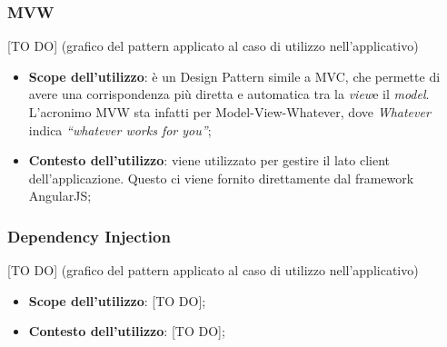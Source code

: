 	\subsubsection{MVW} %
	\label{ssub:mvw}
	[TO DO] (grafico del pattern applicato al caso di utilizzo nell'applicativo)
		\begin{itemize}
			\item \textbf{Scope dell'utilizzo}: è un Design Pattern simile a MVC, che permette di avere una corrispondenza più diretta e automatica tra la \emph{view}e il \emph{model}. L'acronimo MVW sta infatti per Model-View-Whatever, dove \emph{Whatever} indica \emph{``whatever works for you''};
			\item \textbf{Contesto dell'utilizzo}: viene utilizzato per gestire il lato client dell'applicazione. Questo ci viene fornito direttamente dal framework AngularJS;
		\end{itemize}

	\subsubsection{Dependency Injection} %
	\label{ssub:dependency_injection}
	[TO DO] (grafico del pattern applicato al caso di utilizzo nell'applicativo)
		\begin{itemize}
			\item \textbf{Scope dell'utilizzo}: [TO DO];
			\item \textbf{Contesto dell'utilizzo}: [TO DO];
		\end{itemize}

